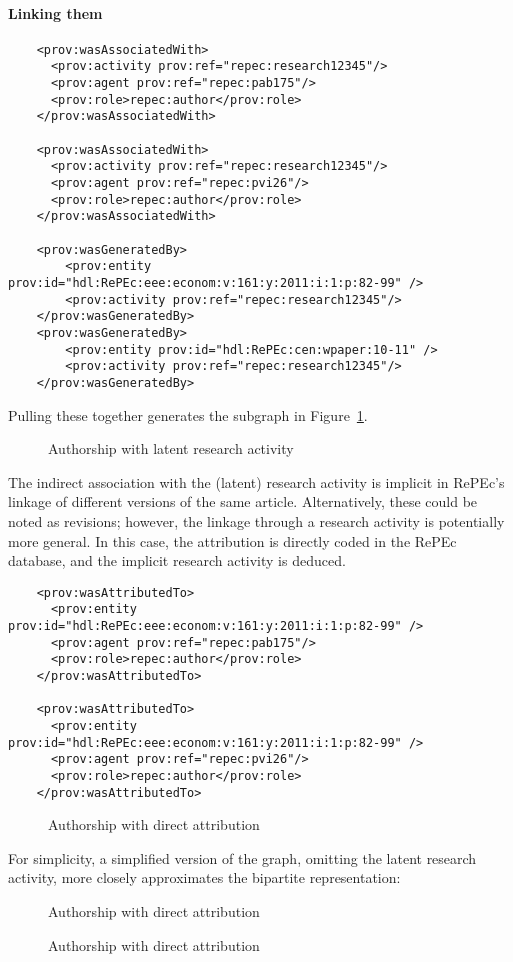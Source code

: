 \documentclass[x11names]{article}
\newcommand{\repec}{RePEc}
\begin{document}
\paragraph{Linking them}
\begin{lstlisting}
    <prov:wasAssociatedWith>
      <prov:activity prov:ref="repec:research12345"/>
      <prov:agent prov:ref="repec:pab175"/>
      <prov:role>repec:author</prov:role>
    </prov:wasAssociatedWith>
    
    <prov:wasAssociatedWith>
      <prov:activity prov:ref="repec:research12345"/>
      <prov:agent prov:ref="repec:pvi26"/>
      <prov:role>repec:author</prov:role>
    </prov:wasAssociatedWith>
    
    <prov:wasGeneratedBy>
		<prov:entity prov:id="hdl:RePEc:eee:econom:v:161:y:2011:i:1:p:82-99" />
		<prov:activity prov:ref="repec:research12345"/>
    </prov:wasGeneratedBy>
    <prov:wasGeneratedBy>
	    <prov:entity prov:id="hdl:RePEc:cen:wpaper:10-11" />
		<prov:activity prov:ref="repec:research12345"/>
    </prov:wasGeneratedBy>
\end{lstlisting}
Pulling these together generates the subgraph in Figure~\ref{fig:author:complex}.
\begin{figure}
\caption{Authorship with latent research activity}\label{fig:author:complex}

\end{figure}


The indirect association with the (latent) research activity is implicit in \repec 's linkage of different versions of the same article. Alternatively, these could be noted as revisions; however, the linkage through a research activity is potentially more general. In this case, the attribution is directly coded in the \repec~ database, and the implicit research activity is deduced.
\begin{lstlisting}
    <prov:wasAttributedTo>
      <prov:entity prov:id="hdl:RePEc:eee:econom:v:161:y:2011:i:1:p:82-99" />
      <prov:agent prov:ref="repec:pab175"/>
      <prov:role>repec:author</prov:role>
    </prov:wasAttributedTo>
    
    <prov:wasAttributedTo>
      <prov:entity prov:id="hdl:RePEc:eee:econom:v:161:y:2011:i:1:p:82-99" />
      <prov:agent prov:ref="repec:pvi26"/>
      <prov:role>repec:author</prov:role>
    </prov:wasAttributedTo>
\end{lstlisting}
\begin{figure}[ht]
\caption{Authorship with direct attribution}\label{fig:author:morecomplex}

\end{figure}
For simplicity, a simplified version of the graph, omitting the latent research activity, more closely approximates the bipartite representation:
\begin{figure}[ht]
\caption{Authorship with direct attribution}\label{fig:author:simple}

\end{figure}
\begin{figure}[ht]
\caption{Authorship with direct attribution}\label{fig:author:bipartite}

\end{figure}
\end{document}
